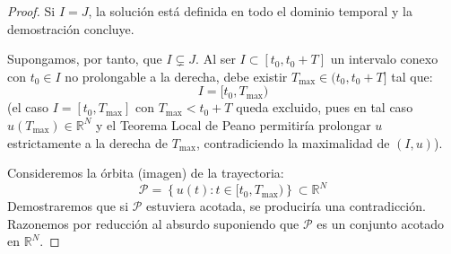 \begin{proof}
    Si $I = J$, la solución está definida en todo el dominio temporal y la demostración concluye.
    
    Supongamos, por tanto, que $I \subsetneq J$. Al ser $I \subset [t_0, t_0 + T]$ un intervalo conexo con $t_0 \in I$ no prolongable a la derecha, debe existir $T_{\max} \in (t_0, t_0 + T]$ tal que:
    \[
        I = [t_0, T_{\max})
    \]
    (el caso $I = [t_0, T_{\max}]$ con $T_{\max} < t_0 + T$ queda excluido, pues en tal caso $u(T_{\max}) \in \mathbb{R}^N$ y el Teorema Local de Peano permitiría prolongar $u$ estrictamente a la derecha de $T_{\max}$, contradiciendo la maximalidad de $(I, u)$).

    Consideremos la órbita (imagen) de la trayectoria:
    \[
        \mathcal{P} = \left\{ u(t) : t \in [t_0, T_{\max}) \right\} \subset \mathbb{R}^N
    \]
    Demostraremos que si $\mathcal{P}$ estuviera acotada, se produciría una contradicción. Razonemos por reducción al absurdo suponiendo que $\mathcal{P}$ es un conjunto acotado en $\mathbb{R}^N$.


\end{proof}
